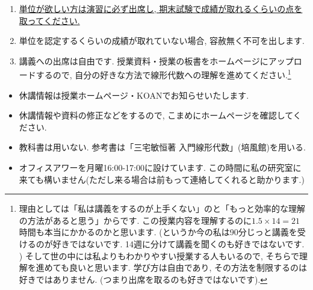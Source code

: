 \documentclass[dvipdfmx,a4paper,11pt]{article}
\theoremstyle{definition}
\begin{document}
\medskip
{}
\begin{enumerate}
  \setlength{\parskip}{0cm} 
  \setlength{\itemsep}{0cm} 
\item \underline{単位が欲しい方は演習に必ず出席し, 期末試験で成績が取れるくらいの点を取ってください.} 
\item 単位を認定するくらいの成績が取れていない場合, 容赦無く不可を出します. 
\item 講義への出席は自由です. 授業資料・授業の板書をホームページにアップロードするので, 自分の好きな方法で線形代数への理解を進めてください.\footnote{理由としては「私は講義をするのが上手くない」のと「もっと効率的な理解の方法があると思う」からです. この授業内容を理解するのに$1.5 \times 14 = 21$時間も本当にかかるのかと思います. (というか今の私は90分じっと講義を受けるのが好きではないです.  14週に分けて講義を聞くのも好きではないです. ) そして世の中には私よりもわかりやすい授業する人もいるので, そちらで理解を進めても良いと思います. 学び方は自由であり, その方法を制限するのは好きではありません. (つまり出席を取るのも好きではないです).}
\end{enumerate}


\vspace{11pt}
\begin{itemize}
  \setlength{\parskip}{0cm} %
  \setlength{\itemsep}{0cm} %
  \item 休講情報は授業ホームページ・KOANでお知らせいたします.
  \item 休講情報や資料の修正などをするので, こまめにホームページを確認してください.
  \item 教科書は用いない. 参考書は「三宅敏恒著 入門線形代数」(培風館)を用いる.
   \item オフィスアワーを月曜16:00-17:00に設けています. この時間に私の研究室に来ても構いません(ただし来る場合は前もって連絡してくれると助かります.)
 \end{itemize}
\end{document}
